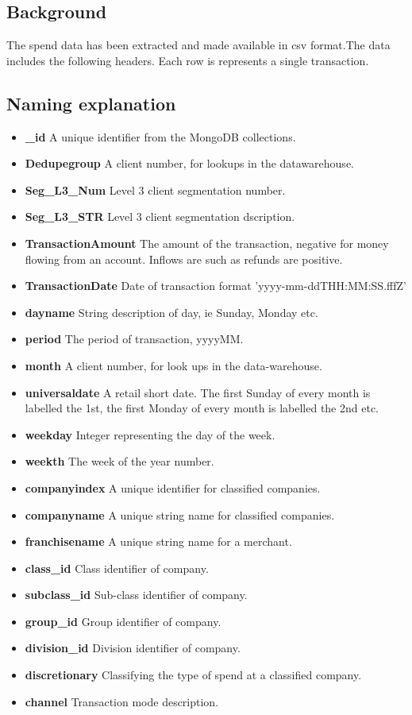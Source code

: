 
\subsection{Background}
The spend data has been extracted and made available in csv format.The data includes the following headers.  Each row is represents a single transaction.
\subsection{Naming explanation}
\begin{itemize}
  \item \textbf{\_id} A unique identifier from the MongoDB collections.
  \item \textbf{Dedupegroup} A client number, for lookups in the datawarehouse.
  \item \textbf{Seg\_L3\_Num} Level 3 client segmentation number.
   \item \textbf{Seg\_L3\_STR} Level 3 client segmentation dscription.
  \item \textbf{TransactionAmount} The amount of the transaction, negative for money flowing from an account.  Inflows are such as refunds are positive.
  \item \textbf{TransactionDate} Date of transaction format \newline 'yyyy-mm-ddTHH:MM:SS.fffZ'
  \item \textbf{dayname} String description of day, ie Sunday, Monday etc.
  \item \textbf{period} The period of transaction, yyyyMM.
  \item \textbf{month} A client number, for look ups in the data-warehouse.
  \item \textbf{universaldate} A retail short date.  The first Sunday of every month is labelled the 1st, the first Monday of every month is labelled the 2nd etc.
  \item \textbf{weekday} Integer representing the day of the week.
  \item \textbf{weekth} The week of the year number.
  
  \item \textbf{companyindex} A unique identifier for classified companies.
  \item \textbf{companyname} A unique string name for classified companies.
  \item \textbf{franchisename} A unique string name for a merchant.
  
  \item \textbf{class\_id} Class identifier of company.
  \item \textbf{subclass\_id} Sub-class identifier of company.
  \item \textbf{group\_id} Group identifier of company.
  \item \textbf{division\_id} Division identifier of company.
  \item \textbf{discretionary} Classifying the type of spend at a classified company.
  \item \textbf{channel} Transaction mode description.


\end{itemize}
